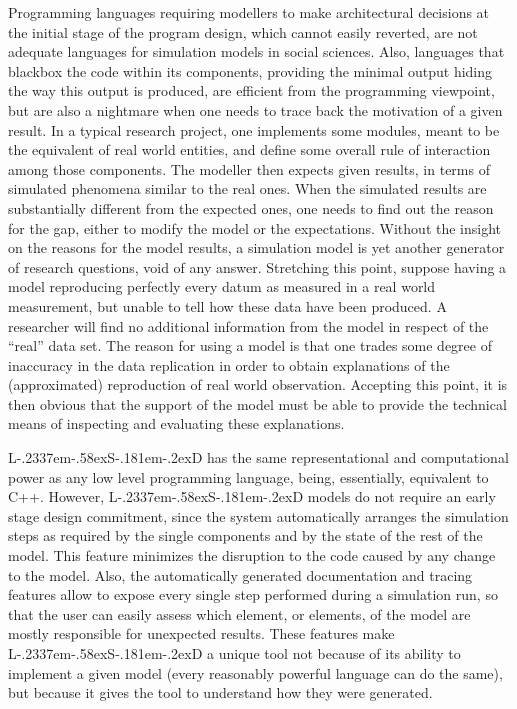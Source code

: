 \documentclass [11pt,a4paper] {book}
\def\LsD{{L\kern-.2337em\lower-.58ex\hbox{S}\kern-.181em\lower-.2ex\hbox{D}}\xspace}
\begin{document}
Programming languages requiring modellers to make architectural decisions at the initial stage of the program design, which cannot easily reverted, are not adequate languages for simulation models in social sciences. Also, languages that blackbox the code within its components, providing the minimal output hiding the way this output is produced, are efficient from the programming viewpoint, but are also a nightmare when one needs to trace back the motivation of a given result. In a typical research project, one implements some modules, meant to be the equivalent of real world entities, and define some overall rule of interaction among those components. The modeller then expects given results, in terms of simulated phenomena similar to the real ones. When the simulated results are substantially different from the expected ones, one needs to find out the reason for the gap, either to modify the model or the expectations. Without the insight on the reasons for the model results, a simulation model is yet another generator of research questions, void of any answer. Stretching this point, suppose having a model reproducing perfectly every datum as measured in a real world measurement, but unable to tell how these data have been produced. A researcher will find no additional information from the model in respect of the ``real'' data set. The reason for using a model is that one trades some degree of inaccuracy in the data replication in order to obtain explanations of the (approximated) reproduction of real world observation. Accepting this point, it is then obvious that the support of the model must be able to provide the technical means of inspecting and evaluating these explanations.

\LsD has the same representational and computational power as any low level programming language, being, essentially, equivalent to C++. However, \LsD models do not require an early stage design commitment, since the system automatically arranges the simulation steps as required by the single components and by the state of the rest of the model. This feature minimizes the disruption to the code caused by any change to the model. Also, the automatically generated documentation and tracing features allow to expose every single step performed during a simulation run, so that the user can easily assess which element, or elements, of the model are mostly responsible for unexpected results. These features make \LsD a unique tool not because of its ability to implement a given model (every reasonably powerful language can do the same), but because it gives the tool to understand how they were generated.
\end{document}
